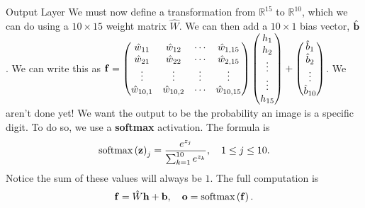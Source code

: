 \documentclass[xcolor=dvipsnames, fontsize=11pt, %
pagesize, %
parskip=half-, t]{beamer}
\begin{document}
\begin{frame}{Output Layer}
We must now define a transformation from $\mathbb{R}^{15}$ to $\mathbb{R}^{10}$, which we can do using a $10\times 15$ weight matrix $\hat{W}$. We can then add a $10\times 1$ bias vector, $\hat{\bold{b}}$. \pause We can write this as $\bold{f}=\begin{pmatrix} \hat{w}_{11} & \hat{w}_{12} & \cdots & \hat{w}_{1,15} \\ \hat{w}_{21} & \hat{w}_{22} & \cdots & \hat{w}_{2,15} \\ \vdots & \vdots & \vdots & \vdots \\ \hat{w}_{10,1} & \hat{w}_{10,2} & \cdots & \hat{w}_{10,15} \end{pmatrix}\begin{pmatrix} h_{1} \\ h_2 \\ \vdots \\ \vdots \\ h_{15} \end{pmatrix}+\begin{pmatrix} \hat{b}_{1} \\ \hat{b}_2 \\ \vdots \\ \hat{b}_{10} \end{pmatrix}$. \pause We aren't done yet! We want the output to be the probability an image is a specific digit. To do so, we use a \textbf{softmax} activation. \pause The formula is $$\displaystyle \text{softmax}\left(\bold{z}\right)_{j}=\frac{e^{z_j}}{\sum_{k=1}^{10}e^{z_k}}, \quad 1\le j \le 10.$$ Notice the sum of these values will always be $1$. \pause The full computation is $$\bold{f}=\hat{W}\bold{h}+\bold{b}, \quad \bold{o}=\text{softmax}\left(\bold{f}\right).$$  
  \end{frame}
\end{document}
